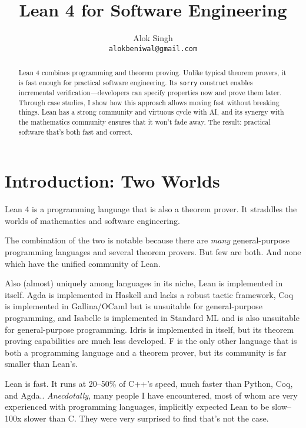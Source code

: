 \documentclass{article}
\title{Lean 4 for Software Engineering}
\author{
  Alok Singh \\
  \texttt{alokbeniwal@gmail.com} \\
}
\begin{document}
\maketitle

\begin{abstract}
  Lean 4 combines programming and theorem proving. Unlike typical theorem provers, it is fast enough for practical software engineering. Its \texttt{sorry} construct enables incremental verification---developers can specify properties now and prove them later. Through case studies, I show how this approach allows moving fast without breaking things. Lean has a strong community and virtuous cycle with AI, and its synergy with the mathematics community ensures that it won't fade away. The result: practical software that's both fast and correct.
\end{abstract}

\tableofcontents

\section{Introduction: Two Worlds}

Lean 4 is a programming language that is also a theorem prover. It straddles the worlds of mathematics and software engineering.

The combination of the two is notable because there are \textit{many} general-purpose programming languages and several theorem provers. But few are both. And none which have the unified community of Lean.

Also (almost) uniquely among languages in its niche, Lean is implemented in itself. Agda is implemented in Haskell and lacks a robust tactic framework, Coq is implemented in Gallina/OCaml but is unsuitable for general-purpose programming, and Isabelle is implemented in Standard ML and is also unsuitable for general-purpose programming. Idris\cite{idris} is implemented in itself, but its theorem proving capabilities are much less developed. F\*\cite{fstar} is the only other language that is both a programming language and a theorem prover, but its community is far smaller than Lean's.

Lean is fast. It runs at 20--50\% of C++'s speed, much faster than Python, Coq, and Agda.. \textit{Anecdotally}, many people I have encountered, most of whom are very experienced with programming languages, implicitly expected Lean to be slow--100x slower than C. They were very surprised to find that's not the case.
\end{document}
